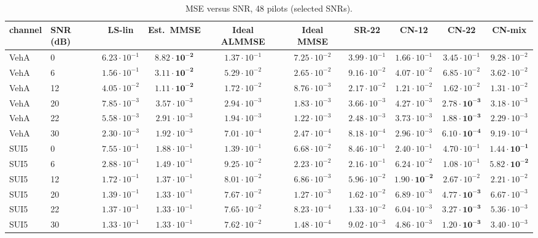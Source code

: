 \documentclass[10pt,a4paper]{article}
\begin{document}
\begin{table}[!htbp]
  \centering
  \caption{MSE versus SNR, 48 pilots (selected SNRs).}
  \label{tab:snr}
  \footnotesize
  \setlength{\tabcolsep}{4pt}
\begin{tabular}{llcccccccc}
\toprule
channel & SNR (dB) & LS-lin & Est.\ MMSE & Ideal ALMMSE & Ideal MMSE & SR-22 & CN-12 & CN-22 & CN-mix \\
\midrule
VehA & 0 & $6.23\cdot10^{-1}$ & $\mathbf{8.82\cdot10^{-2}}$ & $1.37\cdot10^{-1}$ & $7.25\cdot10^{-2}$ & $3.99\cdot10^{-1}$ & $1.66\cdot10^{-1}$ & $3.45\cdot10^{-1}$ & $9.28\cdot10^{-2}$ \\
VehA & 6 & $1.56\cdot10^{-1}$ & $\mathbf{3.11\cdot10^{-2}}$ & $5.29\cdot10^{-2}$ & $2.65\cdot10^{-2}$ & $9.16\cdot10^{-2}$ & $4.07\cdot10^{-2}$ & $6.85\cdot10^{-2}$ & $3.62\cdot10^{-2}$ \\
VehA & 12 & $4.05\cdot10^{-2}$ & $\mathbf{1.11\cdot10^{-2}}$ & $1.72\cdot10^{-2}$ & $8.76\cdot10^{-3}$ & $2.17\cdot10^{-2}$ & $1.21\cdot10^{-2}$ & $1.62\cdot10^{-2}$ & $1.31\cdot10^{-2}$ \\
VehA & 20 & $7.85\cdot10^{-3}$ & $3.57\cdot10^{-3}$ & $2.94\cdot10^{-3}$ & $1.83\cdot10^{-3}$ & $3.66\cdot10^{-3}$ & $4.27\cdot10^{-3}$ & $\mathbf{2.78\cdot10^{-3}}$ & $3.18\cdot10^{-3}$ \\
VehA & 22 & $5.58\cdot10^{-3}$ & $2.91\cdot10^{-3}$ & $1.94\cdot10^{-3}$ & $1.22\cdot10^{-3}$ & $2.48\cdot10^{-3}$ & $3.73\cdot10^{-3}$ & $\mathbf{1.88\cdot10^{-3}}$ & $2.29\cdot10^{-3}$ \\
VehA & 30 & $2.30\cdot10^{-3}$ & $1.92\cdot10^{-3}$ & $7.01\cdot10^{-4}$ & $2.47\cdot10^{-4}$ & $8.18\cdot10^{-4}$ & $2.96\cdot10^{-3}$ & $\mathbf{6.10\cdot10^{-4}}$ & $9.19\cdot10^{-4}$ \\
\midrule
SUI5 & 0 & $7.55\cdot10^{-1}$ & $1.88\cdot10^{-1}$ & $1.39\cdot10^{-1}$ & $6.68\cdot10^{-2}$ & $8.46\cdot10^{-1}$ & $2.40\cdot10^{-1}$ & $4.70\cdot10^{-1}$ & $\mathbf{1.44\cdot10^{-1}}$ \\
SUI5 & 6 & $2.88\cdot10^{-1}$ & $1.49\cdot10^{-1}$ & $9.25\cdot10^{-2}$ & $2.23\cdot10^{-2}$ & $2.16\cdot10^{-1}$ & $6.24\cdot10^{-2}$ & $1.08\cdot10^{-1}$ & $\mathbf{5.82\cdot10^{-2}}$ \\
SUI5 & 12 & $1.72\cdot10^{-1}$ & $1.37\cdot10^{-1}$ & $8.01\cdot10^{-2}$ & $6.86\cdot10^{-3}$ & $5.96\cdot10^{-2}$ & $\mathbf{1.90\cdot10^{-2}}$ & $2.67\cdot10^{-2}$ & $2.21\cdot10^{-2}$ \\
SUI5 & 20 & $1.39\cdot10^{-1}$ & $1.33\cdot10^{-1}$ & $7.67\cdot10^{-2}$ & $1.27\cdot10^{-3}$ & $1.62\cdot10^{-2}$ & $6.89\cdot10^{-3}$ & $\mathbf{4.77\cdot10^{-3}}$ & $6.67\cdot10^{-3}$ \\
SUI5 & 22 & $1.37\cdot10^{-1}$ & $1.33\cdot10^{-1}$ & $7.65\cdot10^{-2}$ & $8.23\cdot10^{-4}$ & $1.33\cdot10^{-2}$ & $6.04\cdot10^{-3}$ & $\mathbf{3.27\cdot10^{-3}}$ & $5.36\cdot10^{-3}$ \\
SUI5 & 30 & $1.33\cdot10^{-1}$ & $1.33\cdot10^{-1}$ & $7.62\cdot10^{-2}$ & $1.48\cdot10^{-4}$ & $9.02\cdot10^{-3}$ & $4.86\cdot10^{-3}$ & $\mathbf{1.20\cdot10^{-3}}$ & $3.40\cdot10^{-3}$ \\
\bottomrule
\end{tabular}
\end{table}
\end{document}
